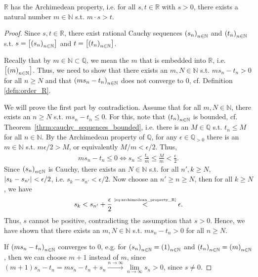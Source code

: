 \begin{theorem}\label{thrm:R_Archimedean_property}
	$\mathbb R$ has the Archimedean property, i.e. for all $s, t\in\mathbb R$ with $s > 0$, there exists a natural number $m\in\mathbb N$ s.t. $m\cdot s > t$.
\end{theorem}

\begin{proof}
	Since $s, t\in\mathbb R$, there exist rational Cauchy sequences $\seq[s_n]$ and $\seq[t_n]$ s.t. $s = \left[\seq[s_n]\right]$ and $t = \left[\seq[t_n]\right]$. 
	
	Recally that by $m\in\mathbb N\subset \mathbb Q$, we mean the $m$ that is embedded into $\mathbb R$, i.e. $\left[\seq[m]\right]$. Thus, we need to show that there exists an $m, N\in\mathbb N$ s.t. $m s_n - t_n > 0$ for all $n\geq N$ and that $\seq[ms_n - t_n]$ does not converge to $0$, cf. Definition \ref{defn:order_R}.
	
	We will prove the first part by contradiction. Assume that for all $m, N\in\mathbb N$, there exists an $n\geq N$ s.t. $ms_n - t_n\leq 0$. For this, note that $\seq[t_n]$ is bounded, cf. \mbox{Theorem \ref{thrm:cauchy_sequences_bounded}}, i.e. there is an $M\in\mathbb Q$ s.t. $t_n \leq M$ for all $n\in\mathbb N$. By the Archimedean property of $\mathbb Q$, for any $\epsilon\in\mathbb Q_{> 0}$ there is an $m\in\mathbb N$ s.t. $m\epsilon/2 > M$, or equivalently $M/m < \epsilon/2$. Thus,
	\begin{align}\label{eq:archimedean_property_R}
		ms_n - t_n \leq 0 \Leftrightarrow s_n \leq \frac{t_n}{m} \leq \frac{M}{m} < \frac{\epsilon}{2}.
	\end{align}
	Since $\seq[s_n]$ is Cauchy, there exists an $N\in\mathbb N$ s.t. for all $n', k \geq N$, $\abs{s_k - s_{n'}} < \epsilon/2$, i.e. $s_k - s_{n'} < \epsilon/2$. Now choose an $n'\geq n\geq N$, then for all $k\geq N$, we have
	\begin{align*}
		s_k < s_{n'} + \frac{\epsilon}{2} \overset{\tiny\eqref{eq:archimedean_property_R}}{<} \epsilon.
	\end{align*}
	Thus, $s$ cannot be positive, contradicting the assumption that $s > 0$. Hence, we have shown that there exists an $m, N\in\mathbb N$ s.t. $m s_n - t_n > 0$ for all $n\geq N$.
	
	If $\seq[ms_n - t_n]$ converges to $0$, e.g. for $\seq[s_n] = \seq[1]$ and $\seq[t_n] = \seq[m]$, then we can choose $m + 1$ instead of $m$, since $(m + 1)s_n - t_n = ms_n - t_n + s_n \overset{n\to\infty}{\longrightarrow} \lim\limits_{n\to\infty}s_n > 0$, since $s \ne 0$.
\end{proof}

